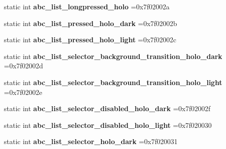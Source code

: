 \begin{DoxyCompactItemize}
static int {\bfseries abc\+\_\+list\+\_\+longpressed\+\_\+holo} =0x7f02002a
\item 
\mbox{\label{classandroid_1_1support_1_1v7_1_1recyclerview_1_1R_1_1drawable_a4bc3fa76f20d170889a3368481d223a2}} 
static int {\bfseries abc\+\_\+list\+\_\+pressed\+\_\+holo\+\_\+dark} =0x7f02002b
\item 
\mbox{\label{classandroid_1_1support_1_1v7_1_1recyclerview_1_1R_1_1drawable_ae393e73668fb80d2eee78bc1c39e3c0a}} 
static int {\bfseries abc\+\_\+list\+\_\+pressed\+\_\+holo\+\_\+light} =0x7f02002c
\item 
\mbox{\label{classandroid_1_1support_1_1v7_1_1recyclerview_1_1R_1_1drawable_a78d2de9345fd327c37c7f2dc47ca1c52}} 
static int {\bfseries abc\+\_\+list\+\_\+selector\+\_\+background\+\_\+transition\+\_\+holo\+\_\+dark} =0x7f02002d
\item 
\mbox{\label{classandroid_1_1support_1_1v7_1_1recyclerview_1_1R_1_1drawable_a9a203ef82ed070b7f31942fffc89dae8}} 
static int {\bfseries abc\+\_\+list\+\_\+selector\+\_\+background\+\_\+transition\+\_\+holo\+\_\+light} =0x7f02002e
\item 
\mbox{\label{classandroid_1_1support_1_1v7_1_1recyclerview_1_1R_1_1drawable_a362bd6d872e4117d753e4224eba1d577}} 
static int {\bfseries abc\+\_\+list\+\_\+selector\+\_\+disabled\+\_\+holo\+\_\+dark} =0x7f02002f
\item 
\mbox{\label{classandroid_1_1support_1_1v7_1_1recyclerview_1_1R_1_1drawable_afb9b0469938b4a36ac596ca33dd34c71}} 
static int {\bfseries abc\+\_\+list\+\_\+selector\+\_\+disabled\+\_\+holo\+\_\+light} =0x7f020030
\item 
\mbox{\label{classandroid_1_1support_1_1v7_1_1recyclerview_1_1R_1_1drawable_a45636b4d435ae04cf27c771c95a4f550}} 
static int {\bfseries abc\+\_\+list\+\_\+selector\+\_\+holo\+\_\+dark} =0x7f020031

\end{DoxyCompactItemize}
